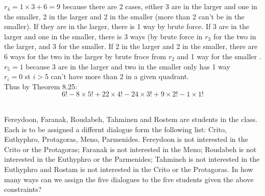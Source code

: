 \documentclass[12pt,letterpaper,boxed]{hmcpset}
\begin{document}
\begin{solution}
\begin{enumerate}[(a)]
 $r_4 = 1\times 3 + 6 = 9$  because there are 2 cases, either 3 are in the larger and one in the smaller, 2 in the larger and 2 in the smaller (more than 2 can't be in the smaller). If they are in the larger, there is 1 way by brute force. If 3 are in the larger and one in the smaller, there is 3 ways (by brute force in $r_3$ for the two in the larger, and 3 for the smaller. If 2 in the larger and 2 in the smaller, there are 6 ways for the two in the larger by brute froce from $r_2$ and 1 way for the smaller  .\\
  $r_5= 1$  because 3 are in the larger and two in the smaller only has 1 way\\
$r_i=0$ st $i>5$ can't have more than 2 in a given quadrant.\\
Thus by Theorem 8.25:
$$\boxed{6!-8\times5! +22\times 4! -24\times 3! + 9\times 2! -1\times 1!}$$
\end{enumerate}
\end{solution}

\begin{problem}[Shahriari 8.3.10][20]\\
Fereydoon, Faranak, Roudabeh, Tahminen and Rostem are students in the class. Each is to be assigned a differnt dialogue form the following list: Crito, Euthyphro, Protagoras, Meno, Parmenides. Fereydoon is not interested in the Crito or the Protagoras; Faranak is not interested in the Meno; Roudabeh is not interested in the Euthyphro or the Parmenides; Tahmineh is not interested in the Euthyphro and Rostam is not interested in the Crito or the Protagoras. In how many ways can we assign the five dialogues to the five students given the above constraints?
\end{problem}
\end{document}
